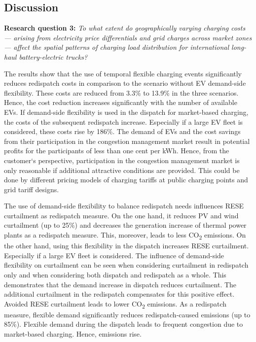 \subsection{Discussion}\label{sec:discussion_RQ3}
\textbf{Research question 3:} \textit{To what extent do geographically varying charging costs — arising from electricity price differentials and grid charges across market zones — affect the spatial patterns of charging load distribution for international long-haul battery-electric trucks?}


The results show that the use of temporal flexible charging events significantly reduces redispatch costs in comparison to the scenario without \ac{EV} demand-side flexibility. These costs are reduced from 3.3\% to 13.9\% in the three scenarios. Hence, the cost reduction increases significantly with the number of available \ac{EV}s. If demand-side flexibility is used in the dispatch for market-based charging, the costs of the subsequent redispatch increase. Especially if a large \ac{EV} fleet is considered, these costs rise by 186\%. 
The demand of \ac{EV}s and the cost savings from their participation in the congestion management market result in potential profits for the participants of less than one cent per kWh. Hence, from the customer`s perspective, participation in the congestion management market is only reasonable if additional attractive conditions are provided. This could be done by different pricing models of charging tariffs at public charging points and grid tariff designs. 


The use of demand-side flexibility to balance redispatch needs influences \ac{RESE} curtailment as redispatch measure. On the one hand, it reduces \ac{PV} and wind curtailment (up to 25\%) and decreases the generation increase of thermal power plants as a redispatch measure. This, moreover, leads to less CO\textsubscript{2} emissions. On the other hand, using this flexibility in the dispatch increases \ac{RESE} curtailment. Especially if a large \ac{EV} fleet is considered. The influence of demand-side flexibility on curtailment can be seen when considering curtailment in redispatch only and when considering both dispatch and redispatch as a whole. This demonstrates that the demand increase in dispatch reduces curtailment. The additional curtailment in the redispatch compensates for this positive effect. Avoided \ac{RESE} curtailment leads to lower CO\textsubscript{2} emissions. As a redispatch measure, flexible demand significantly reduces redispatch-caused emissions (up to 85\%). Flexible demand during the dispatch leads to frequent congestion due to market-based charging. Hence, emissions rise. 


